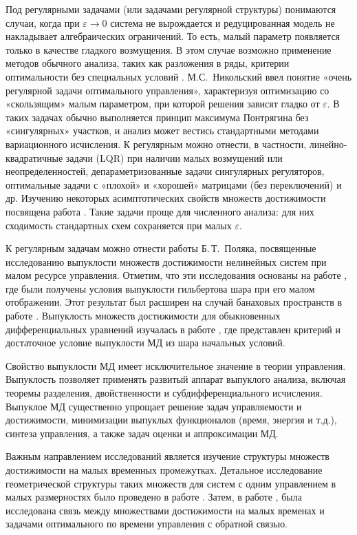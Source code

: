 \documentclass[../abstract.tex]{subfiles}
\begin{document}
Под регулярными задачами (или задачами регулярной структуры) понимаются случаи, когда при $\varepsilon\to0$ система не вырождается и редуцированная модель не накладывает алгебраических ограничений. 
То есть, малый параметр появляется только в качестве гладкого возмущения. 
В этом случае возможно применение методов обычного анализа, таких как разложения в ряды, критерии оптимальности без специальных условий \cite{Haratishvili}. 
М.С. Никольский \cite{Nikolski} ввел понятие «очень регулярной задачи оптимального управления», характеризуя оптимизацию со «скользящим» малым параметром, при которой решения зависят гладко от $\varepsilon$. 
В таких задачах обычно выполняется принцип максимума Понтрягина без «сингулярных» участков, и анализ может вестись стандартными методами вариационного исчисления. 
К регулярным можно отнести, в частности, линейно-квадратичные задачи (LQR) при наличии малых возмущений или неопределенностей, депараметризованные задачи сингулярных регуляторов, оптимальные задачи с «плохой» и «хорошей» матрицами (без переключений) и др. 
Изучению некоторых асимптотических свойств множеств достижимости посвящена работа \cite{Chentsov}.
Такие задачи проще для численного анализа: для них сходимость стандартных схем сохраняется при малых $\varepsilon$.

К регулярным задачам можно отнести работы Б.\,Т.~Поляка, посвященные исследованию выпуклости множеств достижимости нелинейных систем при малом ресурсе управления.
Отметим, что эти исследования основаны на работе \cite{Polyak2001}, где были получены условия выпуклости гильбертова шара при его малом отображении. 
Этот результат был расширен на случай банаховых пространств в работе \cite{Ledyaev}.
Выпуклость множеств достижимости для обыкновенных дифференциальных уравнений изучалась в работе \cite{Reißig}, где представлен критерий и достаточное условие выпуклости МД из шара начальных условий.


Свойство выпуклости МД имеет исключительное значение в теории управления. 
Выпуклость позволяет применять развитый аппарат выпуклого анализа, включая теоремы разделения, двойственности и субдифференциального исчисления.
Выпуклое МД существенно упрощает решение задач управляемости и достижимости, минимизации выпуклых функционалов (время, энергия и т.д.), синтеза управления, а также задач оценки и аппроксимации МД.

Важным направлением исследований является изучение структуры множеств достижимости на малых временных промежутках. 
Детальное исследование геометрической структуры таких множеств для систем с одним управлением в малых размерностях было проведено в работе \cite{Krener1989}. 
Затем, в работе \cite{Shattler1996}, была исследована связь между множествами достижимости на малых временах и задачами оптимального по времени управления с обратной связью.
\end{document}

